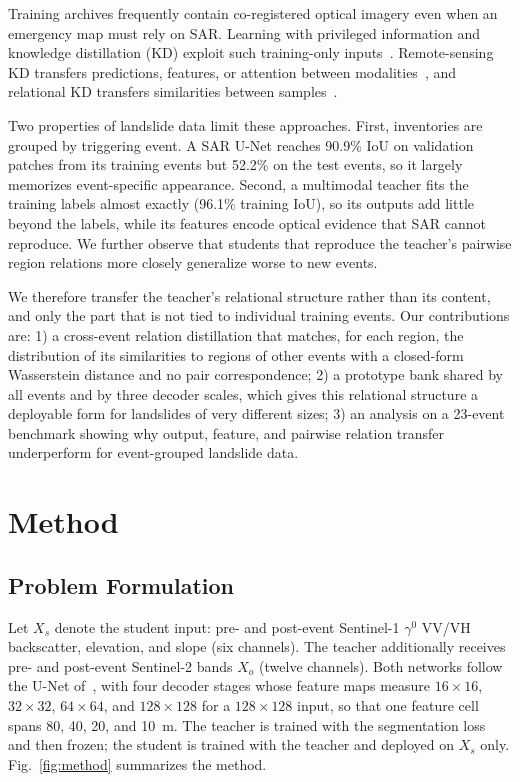 \documentclass[journal]{IEEEtran}
\begin{document}
Training archives frequently contain co-registered optical imagery even when an emergency map must rely on SAR. Learning with privileged information and knowledge distillation (KD) exploit such training-only inputs~\cite{LopezPaz2016,Hinton2015}. Remote-sensing KD transfers predictions, features, or attention between modalities~\cite{Kieu2026DIS2,Sun2027,Lan2025ACAM,Zagoruyko2017}, and relational KD transfers similarities between samples~\cite{Park2019RKD,Tung2019SP,Aslam2024PKDOT}.

Two properties of landslide data limit these approaches. First, inventories are grouped by triggering event. A SAR U-Net reaches 90.9\% IoU on validation patches from its training events but 52.2\% on the test events, so it largely memorizes event-specific appearance. Second, a multimodal teacher fits the training labels almost exactly (96.1\% training IoU), so its outputs add little beyond the labels, while its features encode optical evidence that SAR cannot reproduce. We further observe that students that reproduce the teacher's pairwise region relations more closely generalize worse to new events.

We therefore transfer the teacher's relational structure rather than its content, and only the part that is not tied to individual training events. Our contributions are:
1) a cross-event relation distillation that matches, for each region, the distribution of its similarities to regions of other events with a closed-form Wasserstein distance and no pair correspondence;
2) a prototype bank shared by all events and by three decoder scales, which gives this relational structure a deployable form for landslides of very different sizes;
3) an analysis on a 23-event benchmark showing why output, feature, and pairwise relation transfer underperform for event-grouped landslide data.

\section{Method}
\subsection{Problem Formulation}
Let $X_s$ denote the student input: pre- and post-event Sentinel-1 $\gamma^0$ VV/VH backscatter, elevation, and slope (six channels). The teacher additionally receives pre- and post-event Sentinel-2 bands $X_o$ (twelve channels). Both networks follow the U-Net of~\cite{Orynbaikyzy2025,Ronneberger2015}, with four decoder stages whose feature maps measure $16\times16$, $32\times32$, $64\times64$, and $128\times128$ for a $128\times128$ input, so that one feature cell spans 80, 40, 20, and 10~m. The teacher is trained with the segmentation loss and then frozen; the student is trained with the teacher and deployed on $X_s$ only. Fig.~\ref{fig:method} summarizes the method.
\end{document}
